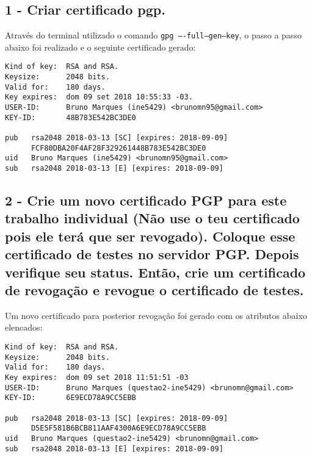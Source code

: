 \documentclass[
    article,            %
    11pt,               %
    oneside,            %
    a4paper,            %
    english,            %
    brazil,             %
    sumario=tradicional,
    ]{abntex2}
\begin{document}
\subsection*{\textbf{1 - Criar certificado pgp.}}

Através do terminal utilizado o comando \texttt{gpg ----full--gen--key}, o passo a passo abaixo foi realizado e o seguinte certificado gerado:

\begin{Verbatim}[frame=single, commandchars=\\\{\}, fontsize=\footnotesize]
Kind of key:  RSA and RSA.
Keysize:      2048 bits.
Valid for:    180 days.
Key expires:  dom 09 set 2018 10:55:33 -03.
USER-ID:      Bruno Marques (ine5429) <brunomn95@gmail.com>
KEY-ID:       48B783E542BC3DE0
    
pub   rsa2048 2018-03-13 [SC] [expires: 2018-09-09]
      FCF80DBA20F4AF28F329261448B783E542BC3DE0
uid   Bruno Marques (ine5429) <brunomn95@gmail.com>
sub   rsa2048 2018-03-13 [E] [expires: 2018-09-09]
\end{Verbatim}

\subsection*{\textbf{2 - Crie um novo certificado PGP para este trabalho individual (Não use o teu certificado pois ele terá que ser revogado). Coloque esse certificado de testes no servidor PGP. Depois verifique seu status. Então, crie um certificado de revogação e revogue o certificado de testes.}}

Um novo certificado para posterior revogação foi gerado com os atributos abaixo elencados:

\begin{Verbatim}[frame=single, commandchars=\\\{\}, fontsize=\footnotesize]
Kind of key:  RSA and RSA.
Keysize:      2048 bits.
Valid for:    180 days.
Key expires:  dom 09 set 2018 11:51:51 -03
USER-ID:      Bruno Marques (questao2-ine5429) <brunomn@gmail.com>
KEY-ID:       6E9ECD78A9CC5EBB

pub   rsa2048 2018-03-13 [SC] [expires: 2018-09-09]
      D5E5F581B6BCB811AAF4300A6E9ECD78A9CC5EBB
uid   Bruno Marques (questao2-ine5429) <brunomn@gmail.com>
sub   rsa2048 2018-03-13 [E] [expires: 2018-09-09]
\end{Verbatim}
\end{document}
